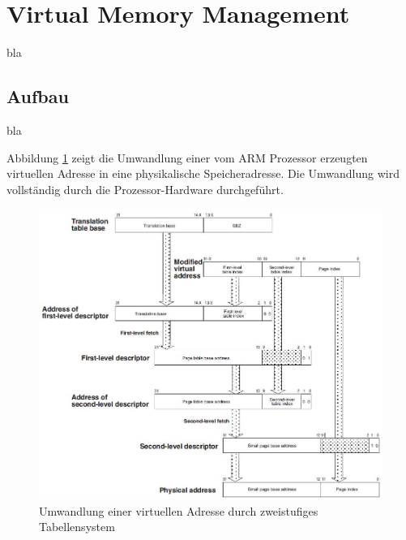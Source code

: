 \section{Virtual Memory Management}
bla

\subsection{Aufbau}
bla

Abbildung \ref{fig:largePageTranslation} zeigt die Umwandlung einer vom ARM Prozessor erzeugten virtuellen Adresse in eine physikalische Speicheradresse. Die Umwandlung wird vollständig durch die Prozessor-Hardware durchgeführt.

\begin{figure}
	\includegraphics[scale=0.8]{figures/largePageTranslation}
	\caption{Umwandlung einer virtuellen Adresse durch zweistufiges Tabellensystem}
	\label{fig:largePageTranslation}
\end{figure}



